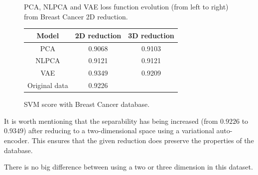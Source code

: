 \begin{figure}
  \centering
   \caption{PCA, NLPCA and VAE loss function evolution (from left to right) from Breast Cancer 2D reduction.}\label{fig:breast_loss_2D}
\end{figure}


\begin{figure}
  \centering
  \begin{tabular}{ccc}
    \hline
    Model    & 2D reduction & 3D reduction \\\hline
    PCA      & 0.9068 & 0.9103\\
    NLPCA    & 0.9121 & 0.9121\\
    VAE      & 0.9349 & 0.9209\\
    \hline
    \hline
    Original data & 0.9226 \\
    \hline
  \end{tabular}
  \caption{SVM score with Breast Cancer database.}\label{tab:breast}
\end{figure}

It is worth mentioning that the separability has being increased (from \(0.9226\) to \(0.9349\)) after reducing to a two-dimensional space using a variational auto-encoder. This ensures that the given reduction does preserve the properties of the database.

There is no big difference between using a two or three dimension in this dataset.

